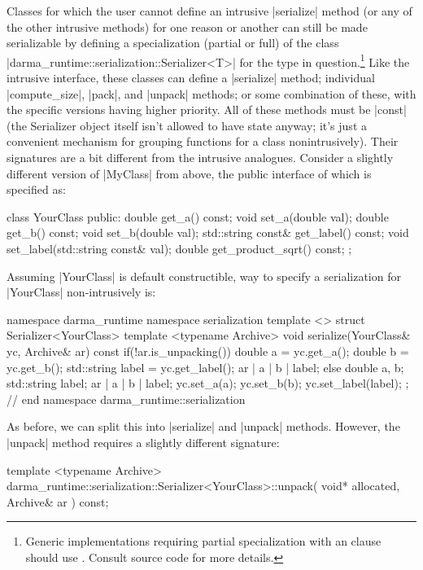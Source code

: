 Classes for which the user cannot define an intrusive |serialize| method (or
any of the other intrusive methods) for one reason or another can still be
made serializable by defining a specialization (partial or full) of the class
|darma_runtime::serialization::Serializer<T>| for the type in
question.\footnote{Generic implementations requiring partial specialization
  with an  clause should use
.  Consult source code for more details.}  Like the intrusive interface,
these classes can define a |serialize| method; individual |compute_size|,
|pack|, and |unpack| methods; or some combination of these, with the specific
versions having higher priority.  All of these methods must be |const| (the
Serializer object itself isn't allowed to have state anyway; it's just a
convenient mechanism for grouping functions for a class nonintrusively).  Their
signatures are a bit different from the intrusive analogues.  Consider a
slightly different version of |MyClass| from above, the public
interface of which is specified as:
\begin{CppCodeNumb}
class YourClass {
  public:
    double get_a() const;
    void set_a(double val);
    double get_b() const;
    void set_b(double val);
    std::string const& get_label() const;
    void set_label(std::string const& val);
    double get_product_sqrt() const;
};
\end{CppCodeNumb}
Assuming |YourClass| is default constructible, way to specify a serialization
for |YourClass| non-intrusively is:
\begin{CppCodeNumb}
namespace darma_runtime { namespace serialization {
template <>
struct Serializer<YourClass> {
  template <typename Archive>
  void serialize(YourClass& yc, Archive& ar) const {
    if(!ar.is_unpacking()) {
      double a = yc.get_a();
      double b = yc.get_b();
      std::string label = yc.get_label();
      ar | a | b | label;
    }
    else {
      double a, b;
      std::string label;
      ar | a | b | label;
      yc.set_a(a);
      yc.set_b(b);
      yc.set_label(label);
    }
  }
};
}} // end namespace darma_runtime::serialization
\end{CppCodeNumb}
As before, we can split this into |serialize| and |unpack| methods.  However,
the |unpack| method requires a slightly different signature:
\begin{CppCodeNumb}
template <typename Archive>
darma_runtime::serialization::Serializer<YourClass>::unpack(
  void* allocated, Archive& ar
) const;
\end{CppCodeNumb}
